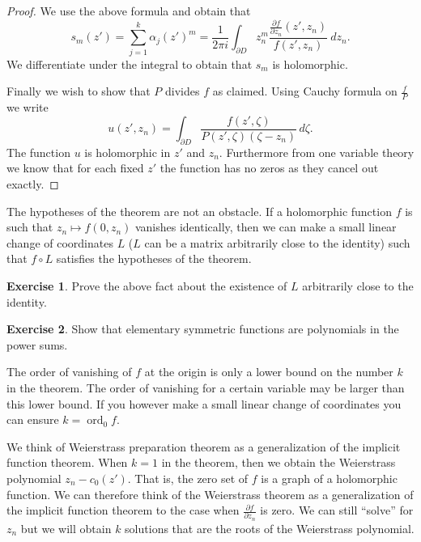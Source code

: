 \documentclass[12pt,openany]{book}
\newcommand{\ord}{\operatorname{ord}}
\theoremstyle{plain}
\theoremstyle{remark}
\theoremstyle{definition}
\newenvironment{exbox}{%
    \def\FrameCommand{\vrule width 1pt \relax\hspace {10pt}}%
    \MakeFramed {\advance \hsize -\width \FrameRestore }%
}{%
    \endMakeFramed
}
\theoremstyle{exercise}
\newtheorem{exercise}{Exercise}[section]
\theoremstyle{example}
\begin{document}
\begin{proof}
We use the above formula and obtain that
\begin{equation*}
s_m(z') = 
\sum_{j=1}^k \alpha_j{(z')}^m
=
\frac{1}{2\pi i}
\int_{\partial D}
z_n^m
\frac{\frac{\partial f}{\partial z_n} (z',z_n)}{f(z',z_n)} ~dz_n .
\end{equation*}
We differentiate under the integral to obtain that $s_m$
is holomorphic. %

Finally we wish to show that $P$ divides $f$ as claimed.  Using Cauchy
formula on $\frac{f}{P}$ we write
\begin{equation*}
u(z',z_n) = \int_{\partial D} \frac{f(z',\zeta)}{P(z',\zeta)(\zeta-z_n)} \, d\zeta .
\end{equation*}
The function $u$ is holomorphic in $z'$ and $z_n$.  Furthermore from one
variable theory we know that for each fixed $z'$ the function has no zeros
as they cancel out exactly.
\end{proof}

The hypotheses of the theorem are not an obstacle.  If a holomorphic
function $f$ is such that $z_n \mapsto f(0,z_n)$ vanishes identically,
then we can make a small linear change of
coordinates $L$ ($L$ can be a matrix arbitrarily close to the identity) such
that $f \circ L$ satisfies the hypotheses of the theorem.

\begin{exbox}
\begin{exercise}
Prove the above fact about the existence of $L$ arbitrarily close to the
identity.
\end{exercise}

\begin{exercise}
Show that elementary symmetric functions are polynomials in the power sums.
\end{exercise}
\end{exbox}

The order of vanishing of $f$ at the origin is only a lower bound
on the number $k$ in the theorem.  The order of vanishing for a certain
variable may be larger than this lower bound.  If you however make a small
linear change of coordinates you can ensure $k = \ord_0 f$.

We think of Weierstrass preparation theorem as a generalization of
the implicit function theorem.  When $k=1$ in the theorem, then we obtain
the Weierstrass polynomial $z_n - c_0(z')$.  That is, the zero set of 
$f$ is a graph of a holomorphic function.
We can therefore think of the Weierstrass theorem as a generalization of the
implicit function theorem to the case when $\frac{\partial f}{\partial z_n}$
is zero.  We can still ``solve'' for $z_n$ but we will obtain $k$ solutions
that are the roots of the Weierstrass polynomial.
\end{document}
